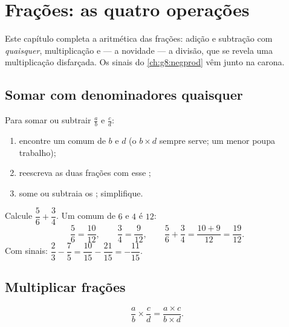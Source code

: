\chapter{Frações: as quatro operações}\label{ch:g8:fractions}

Este capítulo completa a aritmética das frações: adição e subtração com
 \emph{quaisquer}, multiplicação e --- a novidade --- a
divisão, que se revela uma multiplicação disfarçada. Os sinais do
\cref{ch:g8:negprod} vêm junto na carona.

\section{Somar com denominadores quaisquer}

\begin{method}\label{met:g8:fractions:add}
Para somar ou subtrair $\frac ab$ e $\frac cd$:
\begin{enumerate}
  \item encontre um  comum de $b$ e $d$ (o 
        $b \times d$ sempre serve; um menor poupa trabalho);
  \item reescreva as duas frações com esse ;
  \item some ou subtraia os ; simplifique.
\end{enumerate}
\end{method}

\begin{example}\label{ex:g8:fractions:add}
Calcule $\dfrac{5}{6} + \dfrac{3}{4}$. Um  comum de $6$ e $4$ é
$12$:
\[
\frac{5}{6} = \frac{10}{12},
\qquad
\frac{3}{4} = \frac{9}{12},
\qquad
\frac{5}{6} + \frac{3}{4} = \frac{10 + 9}{12} = \frac{19}{12}.
\]
Com sinais: $\dfrac{2}{3} - \dfrac{7}{5} = \dfrac{10}{15} -
\dfrac{21}{15} = -\dfrac{11}{15}$.
\end{example}

\section{Multiplicar frações}

\begin{theorem}\label{thm:g8:fractions:mult}
\[
\frac{a}{b} \times \frac{c}{d} = \frac{a \times c}{b \times d} .
\]
\end{theorem}

